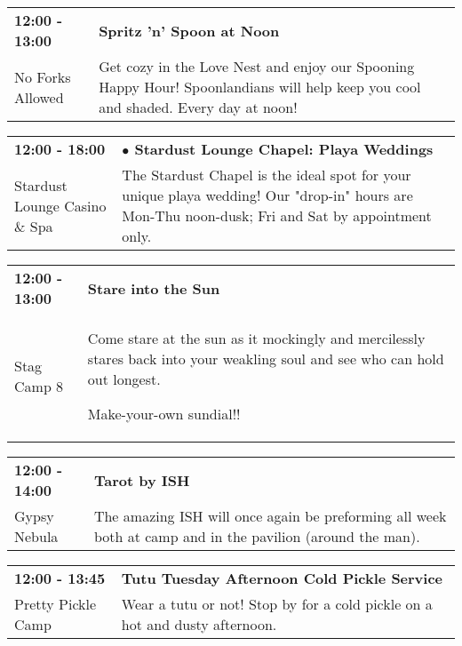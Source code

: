 \begin{tabular}{ p{1in} p{2.2in} }
    \textbf{12:00 - 13:00} & \textbf{Spritz 'n' Spoon at Noon} \\
    No Forks Allowed \newline  & Get cozy in the Love Nest and enjoy our Spooning Happy Hour! Spoonlandians will help keep you cool and shaded. Every day at noon! \\
    \hline 
\end{tabular}
    
\begin{tabular}{ p{1in} p{2.2in} }
    \textbf{12:00 - 18:00} & \textbf{$\bullet$	Stardust Lounge Chapel: Playa Weddings} \\
    Stardust Lounge Casino \& Spa \newline  & The Stardust Chapel is the ideal spot for your unique playa wedding! Our "drop-in" hours are Mon-Thu noon-dusk; Fri and Sat by appointment only. \\
    \hline 
\end{tabular}
    
\begin{tabular}{ p{1in} p{2.2in} }
    \textbf{12:00 - 13:00} & \textbf{Stare into the Sun} \\
    Stag Camp 8 \newline  & Come stare at the sun as it mockingly and mercilessly stares back into your weakling soul and see who can hold out longest.

Make-your-own sundial!! \\
    \hline 
\end{tabular}
    
\begin{tabular}{ p{1in} p{2.2in} }
    \textbf{12:00 - 14:00} & \textbf{Tarot by ISH} \\
    Gypsy Nebula \newline  & The amazing ISH will once again be preforming all week both at camp and in the pavilion (around the man). \\
    \hline 
\end{tabular}
    
\begin{tabular}{ p{1in} p{2.2in} }
    \textbf{12:00 - 13:45} & \textbf{Tutu Tuesday Afternoon Cold Pickle Service} \\
    Pretty Pickle Camp \newline  & Wear a tutu or not! Stop by for a cold pickle on a hot and dusty afternoon. \\
    \hline 
\end{tabular}
    
